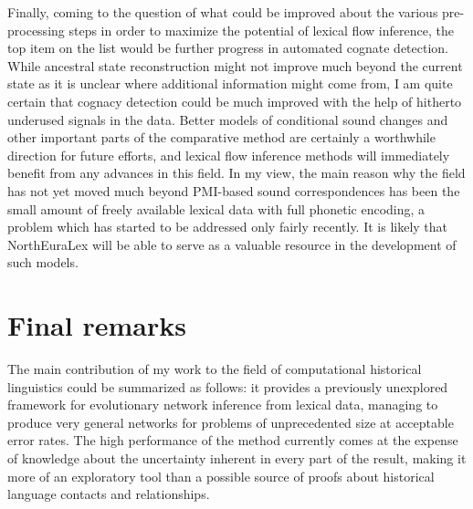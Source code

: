 Finally, coming to the question of what could be improved about the various pre-processing steps in order to maximize the potential of lexical flow inference, the top item on the list would be further progress in automated cognate detection. While ancestral state reconstruction might not improve much beyond the current state as it is unclear where additional information might come from, I am quite certain that cognacy detection could be much improved with the help of hitherto underused signals in the data. Better models of conditional sound changes and other important parts of the comparative method are certainly a worthwhile direction for future efforts, and lexical flow inference methods will immediately benefit from any advances in this field. In my view, the main reason why the field has not yet moved much beyond PMI-based sound correspondences has been the small amount of freely available lexical data with full phonetic encoding, a problem which has started to be addressed only fairly recently. It is likely that 
NorthEuraLex will be able to serve as a valuable resource in the development of such models.

\section{Final remarks}
The main contribution of my work to the field of computational historical linguistics could be summarized as follows: it provides a previously unexplored framework for evolutionary network inference from lexical data, managing to produce very general networks for problems of unprecedented size at acceptable error rates. The high performance of the method currently comes at the expense of knowledge about the uncertainty inherent in every part of the result, making it more of an exploratory tool than a possible source of proofs about historical language contacts and relationships.

